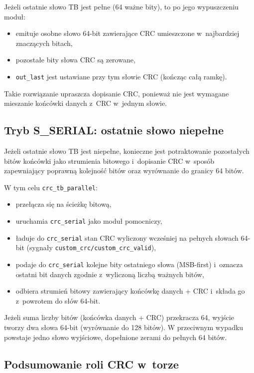 Jeżeli ostatnie słowo TB jest pełne (64 ważne bity), to po jego wypuszczeniu moduł:
\begin{itemize}
    \item emituje osobne słowo 64-bit zawierające CRC umieszczone w~najbardziej znaczących bitach,
    \item pozostałe bity słowa CRC są zerowane,
    \item \texttt{out\_last} jest ustawiane przy tym słowie CRC (kończąc całą ramkę).
\end{itemize}

Takie rozwiązanie upraszcza dopisanie CRC, ponieważ nie jest wymagane mieszanie końcówki danych z~CRC w~jednym słowie.

\subsection{Tryb S\_SERIAL: ostatnie słowo niepełne}
\label{subsec:serial_mode}

Jeżeli ostatnie słowo TB jest niepełne, konieczne jest potraktowanie pozostałych bitów końcówki jako strumienia bitowego i~dopisanie CRC w~sposób zapewniający poprawną kolejność bitów oraz wyrównanie do granicy 64 bitów.

W tym celu \texttt{crc\_tb\_parallel}:
\begin{itemize}
    \item przełącza się na ścieżkę bitową,
    \item uruchamia \texttt{crc\_serial} jako moduł pomocniczy,
    \item ładuje do \texttt{crc\_serial} stan CRC wyliczony wcześniej na pełnych słowach 64-bit (sygnały \texttt{custom\_crc/custom\_crc\_valid}),
    \item podaje do \texttt{crc\_serial} kolejne bity ostatniego słowa (MSB-first) i~oznacza ostatni bit danych zgodnie z~wyliczoną liczbą ważnych bitów,
    \item odbiera strumień bitowy zawierający końcówkę danych + CRC i~składa go z~powrotem do słów 64-bit.
\end{itemize}

Jeżeli suma liczby bitów (końcówka danych + CRC) przekracza 64, wyjście tworzy dwa słowa 64-bit (wyrównanie do 128 bitów). W przeciwnym wypadku powstaje jedno słowo wyjściowe, dopełnione zerami do pełnych 64 bitów.


\subsection{Podsumowanie roli CRC w~torze}
\label{subsec:crc_summary}

